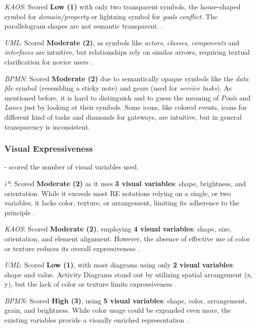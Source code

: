 \documentclass[runningheads]{llncs}
\begin{document}
\textit{KAOS}: Scored \textbf{Low (1)} with only two transparent symbols, the house-shaped symbol for \textit{domain/property} or lightning symbol for \textit{goals conflict}. The parallelogram shapes are not semantic transparent. \cite{Matulevicius2007}.

\textit{UML}: Scored \textbf{Moderate (2)}, as symbols like \textit{actors}, \textit{classes}, \textit{components} and \textit{interfaces} are intuitive, but relationships rely on similar arrows, requiring textual clarification for novice users \cite{Moody2008}.

\textit{BPMN}: Scored \textbf{Moderate (2)} due to semantically opaque symbols like the \textit{data file} symbol (resembling a sticky note) and gears (used for \textit{service tasks}). As mentioned before, it is hard to distinguish and to guess the meaning of \textit{Pools} and \textit{Lanes} just by looking at their symbols. Some icons, like colored events, icons for different kind of tasks and diamonds for gateways, are intuitive, but in general transparency is inconsistent\cite{Genon2011}.

\subsubsection{Visual Expressiveness} - scored the number of visual variables used.

\textit{i*}: Scored \textbf{Moderate (2) }as it uses \textbf{3 visual variables}: shape, brightness, and orientation. While it exceeds most RE notations relying on a single, or two variables, it lacks color, texture, or arrangement, limiting its adherence to the principle \cite{Moody2010}.

\textit{KAOS}: Scored \textbf{Moderate (2)}, employing \textbf{4 visual variables}: shape, size, orientation, and element alignment. However, the absence of effective use of color or texture reduces its overall expressiveness \cite{Matulevicius2007}.

\textit{UML}: Scored \textbf{Low (1)}, with most diagrams using only \textbf{2 visual variables}: shape and value. Activity Diagrams stand out by utilizing spatial arrangement (x, y), but the lack of color or texture limits expressiveness \cite{Moody2008}.

\textit{BPMN}: Scored\textbf{ High (3)}, using \textbf{5 visual variables}: shape, color, arrangement, grain, and brightness. While color usage could be expanded even more, the existing variables provide a visually enriched representation \cite{Genon2011}.
\end{document}
